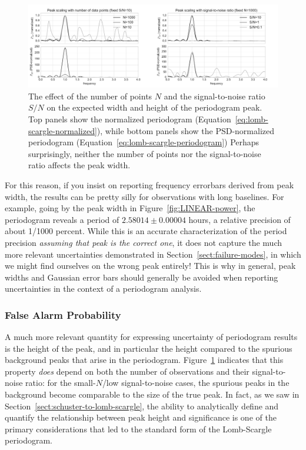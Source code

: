 \documentclass[preprint]{aastex}
\newcommand{\fig}[1]{Figure~\ref{fig:#1}}
\newcommand{\figlabel}[1]{\label{fig:#1}}
\newcommand{\Eq}[1]{Equation~\ref{eq:#1}}
\newcommand{\eq}[1]{\Eq{#1}}
\newcommand{\Sect}[1]{Section~\ref{sect:#1}}
\newcommand{\sect}[1]{\Sect{#1}}
\newcommand{\sectlabel}[1]{\label{sect:#1}}
\begin{document}
\begin{figure}[ht]
  \centering
  \includegraphics[width=\textwidth]{fig26_peak_width_height}
  \caption{The effect of the number of points $N$ and the signal-to-noise
    ratio $S/N$ on the expected width and height of the periodogram peak.
    Top panels show the normalized periodogram (\eq{lomb-scargle-normalized}),
    while bottom panels show the PSD-normalized periodogram
    (\eq{lomb-scargle-periodogram})
    Perhaps surprisingly, neither the number of points nor the signal-to-noise
    ratio affects the peak width. \figlabel{peak-width-height}}
\end{figure}

For this reason, if you insist on reporting frequency errorbars derived from
peak width, the results can be pretty silly for observations with
long baselines.
For example, going by the peak width in \fig{LINEAR-power}, the
periodogram reveals a period of $2.58014 \pm 0.00004$ hours, a relative
precision of about 1/1000 percent.
While this is an accurate characterization of the period precision
{\it assuming that peak is the correct one}, it does not capture the
much more relevant uncertainties demonstrated in \sect{failure-modes},
in which we might find ourselves on the wrong peak entirely!
This is why in general, peak widths and Gaussian error bars should generally
be avoided when reporting uncertainties in the context of a periodogram
analysis.

\subsubsection{False Alarm Probability}
\sectlabel{false-alarm-probability}

A much more relevant quantity for expressing uncertainty of periodogram results
is the height of the peak, and in particular the height compared to the
spurious background peaks that arise in the periodogram.
\fig{peak-width-height} indicates that this property {\it does} depend on
both the number of observations and their signal-to-noise ratio: for the
small-$N$/low signal-to-noise cases, the spurious peaks in the background
become comparable to the size of the true peak.
In fact, as we saw in \sect{schuster-to-lomb-scargle}, the ability to
analytically define and quantify the relationship between peak height
and significance is one of the primary considerations that led to the
standard form of the Lomb-Scargle periodogram.
\end{document}

